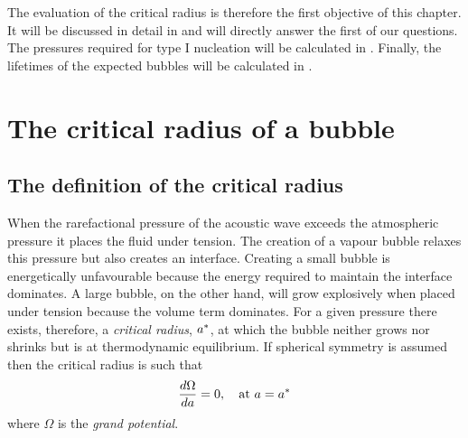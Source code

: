 
The evaluation of the critical radius is therefore the first objective of this chapter.
It will be discussed in detail in  and will directly answer the first of our questions.
The pressures required for type I nucleation will be calculated in .
Finally, the lifetimes of the expected bubbles will be calculated in .

\section{The critical radius of a bubble} \label{sec:nuc:radius}

\subsection{The definition of the critical radius}



When the rarefactional pressure of the acoustic wave exceeds the atmospheric pressure it places the fluid under tension.
The creation of a vapour bubble  relaxes this pressure but  also creates an interface.
Creating a small bubble is energetically unfavourable because the energy required to maintain the interface dominates.
A large bubble, on the other hand, will grow explosively when placed under tension because the volume term dominates.
For a given pressure there exists, therefore, a {\em critical radius}, ${a^\ast}$, at which the bubble neither grows nor shrinks 
but is at thermodynamic equilibrium.
If  spherical symmetry is assumed then 
the critical radius is such that\cite{Oxtoby1992,Oxtoby1988}
\begin{align}
  \frac{d \Omega}{d a} =0,\quad\text{at $a = {a^\ast}$} \label{eqn:nuc:astarR}
\end{align}
where $\Omega$ is the {\em grand potential}.

